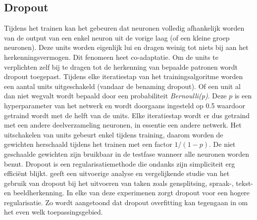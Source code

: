 \subsection{Dropout}
Tijdens het trainen kan het gebeuren dat neuronen volledig afhankelijk worden van de output van een enkel neuron uit de vorige laag (of een kleine groep neuronen). Deze units worden eigenlijk lui en dragen weinig tot niets bij aan het herkenningsvermogen. Dit fenomeen heet co-adaptatie. Om de units te verplichten zelf bij te dragen tot de herkenning van bepaalde patronen wordt dropout toegepast.
\npar Tijdens elke iteratiestap van het trainingsalgoritme worden een aantal units uitgeschakeld (vandaar de benaming dropout). Of een unit al dan niet wegvalt wordt bepaald door een probabiliteit \textit{Bernoulli(p)}. Deze $p$ is een hyperparameter van het netwerk en wordt doorgaans ingesteld op 0.5 waardoor getraind wordt met de helft van de units. Elke iteratiestap wordt er dus getraind met een andere deelverzameling neuronen, in essentie een andere netwerk. Het uitschakelen van units gebeurt enkel tijdens training, daarom worden de gewichten herschaald tijdens het trainen met een factor $1/(1-p)$. De niet geschaalde gewichten zijn bruikbaar in de testfase wanneer alle neuronen worden benut.
\npar Dropout is een regularisatiemethode die ondanks zijn simpliciteit erg effici\"ent blijkt. \cite{dropout} geeft een uitvoerige analyse en vergelijkende studie van het gebruik van dropout bij het uitvoeren van taken zoals gensplitsing, spraak-, tekst- en beeldherkenning. In elke van deze experimenen zorgt dropout voor een hogere regularisatie. Zo wordt aangetoond dat dropout overfitting kan tegengaan in om het even welk toepassingsgebied.

